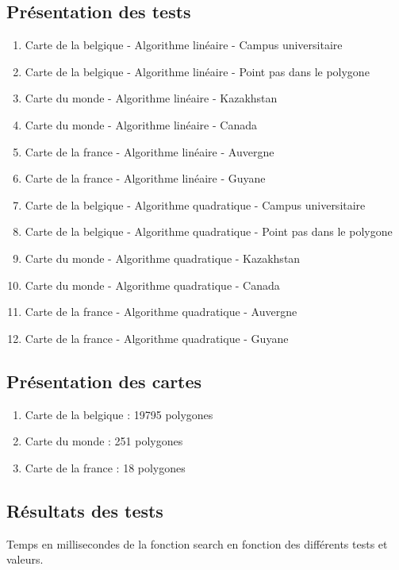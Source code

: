 \documentclass[utf8]{article}
\begin{document}
\begin{large}
  \subsection{Présentation des tests}
  \begin{enumerate}
    \item Carte de la belgique - Algorithme linéaire - Campus universitaire
    \item Carte de la belgique - Algorithme linéaire - Point pas dans le polygone
    \item Carte du monde - Algorithme linéaire - Kazakhstan
    \item Carte du monde - Algorithme linéaire - Canada
    \item Carte de la france - Algorithme linéaire - Auvergne
    \item Carte de la france - Algorithme linéaire - Guyane
    \item Carte de la belgique - Algorithme quadratique - Campus universitaire
    \item Carte de la belgique - Algorithme quadratique - Point pas dans le polygone
    \item Carte du monde - Algorithme quadratique - Kazakhstan
    \item Carte du monde - Algorithme quadratique - Canada
    \item Carte de la france - Algorithme quadratique - Auvergne
    \item Carte de la france - Algorithme quadratique - Guyane
  \end{enumerate}

  \subsection{Présentation des cartes}
  \begin{enumerate}
    \item Carte de la belgique : 19795 polygones
    \item Carte du monde : 251 polygones
    \item Carte de la france : 18 polygones
  \end{enumerate}




  \subsection{Résultats des tests}
  \par
  \indent
  Temps en millisecondes de la fonction search en fonction des différents tests et valeurs.


\end{large}
\end{document}
